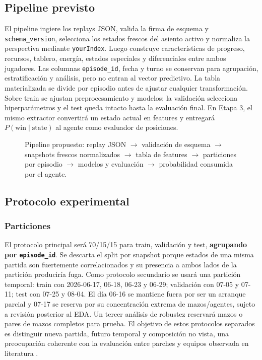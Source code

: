 \subsection{Pipeline previsto}
\label{subsec:pipeline}
El pipeline ingiere los replays JSON, valida la firma de esquema y
\texttt{schema\_version}, selecciona los estados frescos del asiento
activo y normaliza la perspectiva mediante \texttt{yourIndex}. Luego
construye características de progreso, recursos, tablero, energía,
estados especiales y diferenciales entre ambos jugadores. Las columnas
\texttt{episode\_id}, fecha y turno se conservan para agrupación,
estratificación y análisis, pero no entran al vector predictivo. La
tabla materializada se divide por episodio antes de ajustar cualquier
transformación. Sobre train se ajustan preprocesamiento y modelos; la
validación selecciona hiperparámetros y el test queda intacto hasta la
evaluación final. En Etapa 3, el mismo extractor convertirá un estado
actual en features y entregará $P(\mathrm{win}\mid\mathrm{state})$ al
agente como evaluador de posiciones.

\begin{figure}[!t]
  \centering
  \caption{Pipeline propuesto: replay JSON $\rightarrow$ validación de
  esquema $\rightarrow$ snapshots frescos normalizados $\rightarrow$
  tabla de features $\rightarrow$ particiones por episodio $\rightarrow$
  modelos y evaluación $\rightarrow$ probabilidad consumida por el agente.}
  \label{fig:pipeline}
\end{figure}

\subsection{Protocolo experimental}
\label{subsec:protocolo}

\subsubsection{Particiones}
El protocolo principal será 70/15/15 para train, validación y test,
\textbf{agrupando por \texttt{episode\_id}}. Se descarta el split por
snapshot porque estados de una misma partida son fuertemente
correlacionados y su presencia a ambos lados de la partición produciría
fuga. Como protocolo secundario se usará una partición temporal:
train con 2026-06-17, 06-18, 06-23 y 06-29; validación con 07-05 y
07-11; test con 07-25 y 08-04. El día 06-16 se mantiene fuera por ser
un arranque parcial y 07-17 se reserva por su concentración extrema de
mazos/agentes, sujeto a revisión posterior al EDA. Un tercer análisis de
robustez reservará mazos o pares de mazos completos para prueba. El
objetivo de estos protocolos separados es distinguir nueva partida,
futuro temporal y composición no vista, una preocupación coherente con
la evaluación entre parches y equipos observada en literatura
\cite{chitayat_meta_2023,angliss_vgcbench_2026}.

